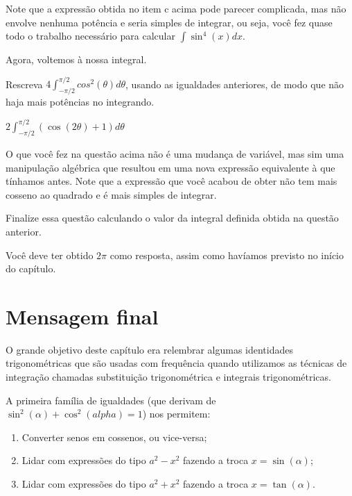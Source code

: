 \documentclass[main_estudante.tex]{subfiles}
\begin{document}
Note que a expressão obtida no item c acima pode parecer complicada, mas não envolve nenhuma potência e seria simples de integrar, ou seja, você fez quase todo o trabalho necessário para calcular $\int \sin^4(x)dx$.

Agora, voltemos à nossa integral.

\begin{questao}
Rescreva $4\int_{-\pi/2}^{\pi/2} cos^2(\theta)d\theta$, usando as igualdades anteriores, de modo que não haja mais potências no integrando.
\end{questao}

\begin{gabarito}
	\begin{gabaritoQuestao}
		$2\int_{-\pi/2}^{\pi/2} (\cos(2\theta)+1)d\theta$
	\end{gabaritoQuestao}
\end{gabarito}

O que você fez na questão acima não é uma mudança de variável, mas sim uma manipulação algébrica que resultou em uma nova expressão equivalente à que tínhamos antes. Note que a expressão que você acabou de obter não tem mais cosseno ao quadrado e é mais simples de integrar.


\begin{questao}
Finalize essa questão calculando o valor da integral definida obtida na questão anterior.
\end{questao}

Você deve ter obtido $2\pi$ como resposta, assim como havíamos previsto no início do capítulo.

\section{Mensagem final}

O grande objetivo deste capítulo era relembrar algumas identidades trigonométricas que são usadas com frequência quando utilizamos as técnicas de integração chamadas substituição trigonométrica e integrais trigonométricas.

A primeira família de igualdades (que derivam de $\sin^2(\alpha)+\cos^2(alpha)=1$) nos permitem:
\begin{enumerate}[1)]
\item Converter senos em cossenos, ou vice-versa;
\item Lidar com expressões do tipo $a^2-x^2$ fazendo a troca $x=\sin(\alpha)$;
\item Lidar com expressões do tipo $a^2+x^2$ fazendo a troca $x=\tan(\alpha)$.
\end{enumerate}
\end{document}
